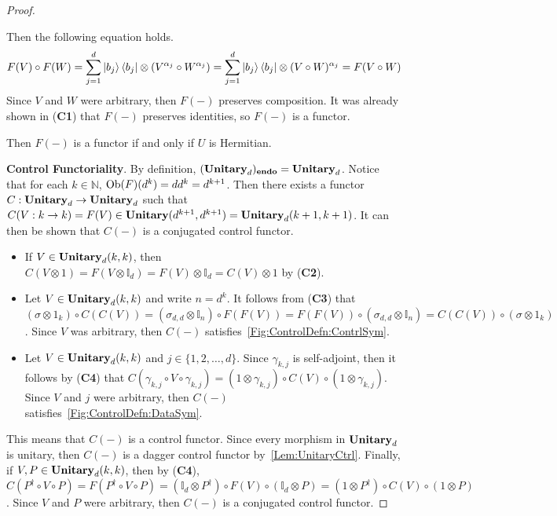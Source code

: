 \begin{proof}
\begin{itemize}
          Then the following equation holds.
          \begin{equation*}
              F( V ) \circ F( W )
              =
              \sum_{j=1}^{d} \ket{b_j} \bra{b_j} \otimes ( V^{\alpha_j} \circ W^{\alpha_j} )
              =
              \sum_{j=1}^{d} \ket{b_j} \bra{b_j} \otimes ( V \circ W )^{\alpha_j}
              =
              F( V \circ W )
          \end{equation*}
          Since $V$ and $W$ were arbitrary, then $F( - )$ preserves composition.
          It was already shown in (\textbf{C1}) that $F( - )$ preserves identities, so $F( - )$ is a functor.
    \end{itemize}
    Then $F( - )$ is a functor if and only if $U$ is Hermitian.

    \vspace{1em}
    \noindent
    \textbf{Control Functoriality}.
    By definition, $( \mathbf{Unitary}_d )_\mathbf{endo} = \mathbf{Unitary}_d$.
    Notice that for each $k \in \mathbb{N}$, $\operatorname{Ob}( F )( d^k ) = d d^k = d^{k+1}$.
    Then there exists a functor $C: \mathbf{Unitary}_d \to \mathbf{Unitary}_d$ such that $C( V: k \to k ) = F( V ) \in \mathbf{Unitary}( d^{k+1}, d^{k+1} ) = \mathbf{Unitary}_d( k + 1, k + 1 )$.
    It can then be shown that $C( - )$ is a conjugated control functor.
    \begin{itemize}
    \item If $V \in \mathbf{Unitary}_d( k, k )$, then $C( V \otimes 1 ) = F( V \otimes \mathbb{I}_d ) = F( V ) \otimes \mathbb{I}_d = C( V ) \otimes 1$ by (\textbf{C2}).
    \item Let $V \in \mathbf{Unitary}_d( k, k )$ and write $n = d^k$.
          It follows from (\textbf{C3}) that $( \sigma \otimes 1_k ) \circ C( C( V ) ) = ( \sigma_{d,d} \otimes \mathbb{I}_n ) \circ F( F( V ) ) = F( F( V ) )\circ ( \sigma_{d,d} \otimes \mathbb{I}_n ) = C( C( V ) ) \circ ( \sigma \otimes 1_k )$.
          Since $V$ was arbitrary, then $C( - )$ satisfies~\cref{Fig:ControlDefn:ContrlSym}.
    \item Let $V \in \mathbf{Unitary}_d( k, k )$ and $j \in \{ 1, 2, \ldots, d \}$.
          Since $\gamma_{k,j}$ is self-adjoint, then it follows by (\textbf{C4}) that $C( \gamma_{k,j} \circ V \circ \gamma_{k,j} ) = ( 1 \otimes \gamma_{k,j} ) \circ C( V ) \circ ( 1 \otimes \gamma_{k,j} )$.
          Since $V$ and $j$ were arbitrary, then $C( - )$ satisfies~\cref{Fig:ControlDefn:DataSym}.
    \end{itemize}
    This means that $C( - )$ is a control functor.
    Since every morphism in $\mathbf{Unitary}_d$ is unitary, then $C( - )$ is a dagger control functor by~\cref{Lem:UnitaryCtrl}.
    Finally, if $V, P \in \mathbf{Unitary}_d( k, k )$, then by (\textbf{C4}), $C( P^\dagger \circ V \circ P ) = F( P^\dagger \circ V \circ P ) = ( \mathbb{I}_d \otimes P^\dagger ) \circ F( V ) \circ ( \mathbb{I}_d \otimes P ) = ( 1 \otimes P^\dagger ) \circ C( V ) \circ ( 1 \otimes P )$.
    Since $V$ and $P$ were arbitrary, then $C( - )$ is a conjugated control functor.


\end{proof}
